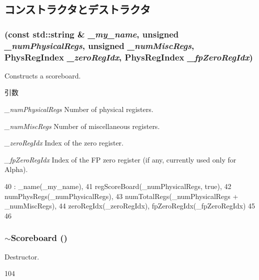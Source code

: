 \subsection{コンストラクタとデストラクタ}
\hypertarget{classScoreboard_a4ad4a4f708e90ce7482859dd19a04a98}{
\subsubsection[{Scoreboard}]{ (const std::string \& {\em \_\-my\_\-name}, \/  unsigned {\em \_\-numPhysicalRegs}, \/  unsigned {\em \_\-numMiscRegs}, \/  {\bf PhysRegIndex} {\em \_\-zeroRegIdx}, \/  {\bf PhysRegIndex} {\em \_\-fpZeroRegIdx})}}
\label{classScoreboard_a4ad4a4f708e90ce7482859dd19a04a98}
Constructs a scoreboard. 
\begin{DoxyParams}{引数}
\item[{\em \_\-numPhysicalRegs}]Number of physical registers. \item[{\em \_\-numMiscRegs}]Number of miscellaneous registers. \item[{\em \_\-zeroRegIdx}]Index of the zero register. \item[{\em \_\-fpZeroRegIdx}]Index of the FP zero register (if any, currently used only for Alpha). \end{DoxyParams}



\begin{DoxyCode}
40     : _name(_my_name),
41       regScoreBoard(_numPhysicalRegs, true),
42       numPhysRegs(_numPhysicalRegs),
43       numTotalRegs(_numPhysicalRegs + _numMiscRegs),
44       zeroRegIdx(_zeroRegIdx), fpZeroRegIdx(_fpZeroRegIdx)
45 {
46 }
\end{DoxyCode}
\hypertarget{classScoreboard_ad2193b96d3a42d5a954f64072cc890c2}{
\subsubsection[{$\sim$Scoreboard}]{\setlength{\rightskip}{0pt plus 5cm}$\sim${\bf Scoreboard} ()}}
\label{classScoreboard_ad2193b96d3a42d5a954f64072cc890c2}
Destructor. 


\begin{DoxyCode}
104 {}
\end{DoxyCode}



